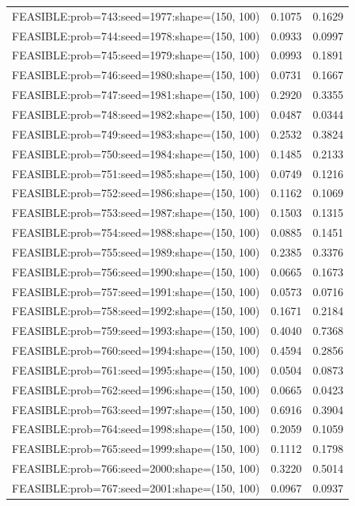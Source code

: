 \begin{longtable}{lcc}
FEASIBLE:prob=743:seed=1977:shape=(150, 100) &   0.1075 & 0.1629 \\
FEASIBLE:prob=744:seed=1978:shape=(150, 100) &   0.0933 & 0.0997 \\
FEASIBLE:prob=745:seed=1979:shape=(150, 100) &   0.0993 & 0.1891 \\
FEASIBLE:prob=746:seed=1980:shape=(150, 100) &   0.0731 & 0.1667 \\
FEASIBLE:prob=747:seed=1981:shape=(150, 100) &   0.2920 & 0.3355 \\
FEASIBLE:prob=748:seed=1982:shape=(150, 100) &   0.0487 & 0.0344 \\
FEASIBLE:prob=749:seed=1983:shape=(150, 100) &   0.2532 & 0.3824 \\
FEASIBLE:prob=750:seed=1984:shape=(150, 100) &   0.1485 & 0.2133 \\
FEASIBLE:prob=751:seed=1985:shape=(150, 100) &   0.0749 & 0.1216 \\
FEASIBLE:prob=752:seed=1986:shape=(150, 100) &   0.1162 & 0.1069 \\
FEASIBLE:prob=753:seed=1987:shape=(150, 100) &   0.1503 & 0.1315 \\
FEASIBLE:prob=754:seed=1988:shape=(150, 100) &   0.0885 & 0.1451 \\
FEASIBLE:prob=755:seed=1989:shape=(150, 100) &   0.2385 & 0.3376 \\
FEASIBLE:prob=756:seed=1990:shape=(150, 100) &   0.0665 & 0.1673 \\
FEASIBLE:prob=757:seed=1991:shape=(150, 100) &   0.0573 & 0.0716 \\
FEASIBLE:prob=758:seed=1992:shape=(150, 100) &   0.1671 & 0.2184 \\
FEASIBLE:prob=759:seed=1993:shape=(150, 100) &   0.4040 & 0.7368 \\
FEASIBLE:prob=760:seed=1994:shape=(150, 100) &   0.4594 & 0.2856 \\
FEASIBLE:prob=761:seed=1995:shape=(150, 100) &   0.0504 & 0.0873 \\
FEASIBLE:prob=762:seed=1996:shape=(150, 100) &   0.0665 & 0.0423 \\
FEASIBLE:prob=763:seed=1997:shape=(150, 100) &   0.6916 & 0.3904 \\
FEASIBLE:prob=764:seed=1998:shape=(150, 100) &   0.2059 & 0.1059 \\
FEASIBLE:prob=765:seed=1999:shape=(150, 100) &   0.1112 & 0.1798 \\
FEASIBLE:prob=766:seed=2000:shape=(150, 100) &   0.3220 & 0.5014 \\
FEASIBLE:prob=767:seed=2001:shape=(150, 100) &   0.0967 & 0.0937 \\

\end{longtable}
